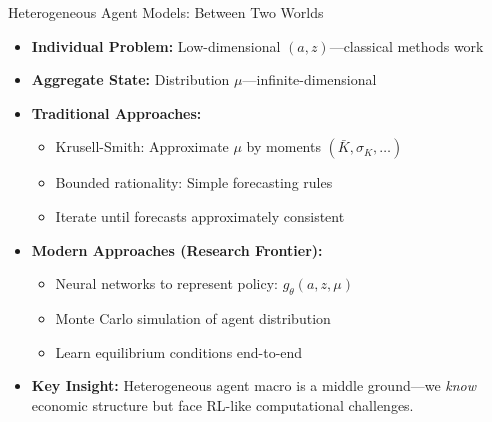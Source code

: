 \documentclass[10pt,english,aspectratio=169]{beamer}
\begin{document}
\begin{frame}{Heterogeneous Agent Models: Between Two Worlds}
\begin{itemize}
\item \textbf{Individual Problem:} Low-dimensional $(a, z)$---classical methods work
\item \textbf{Aggregate State:} Distribution $\mu$---infinite-dimensional

\medskip
\item \textbf{Traditional Approaches:}
\begin{itemize}
    \item Krusell-Smith: Approximate $\mu$ by moments $(\bar{K}, \sigma_K, \ldots)$
    \item Bounded rationality: Simple forecasting rules
    \item Iterate until forecasts approximately consistent
\end{itemize}

\medskip
\item \textbf{Modern Approaches (Research Frontier):}
\begin{itemize}
    \item Neural networks to represent policy: $g_\theta(a, z, \mu)$
    \item Monte Carlo simulation of agent distribution
    \item Learn equilibrium conditions end-to-end
\end{itemize}

\medskip
\item \textbf{Key Insight:} Heterogeneous agent macro is a middle ground---we \emph{know} economic structure but face RL-like computational challenges.
\end{itemize}
\end{frame}
\end{document}

